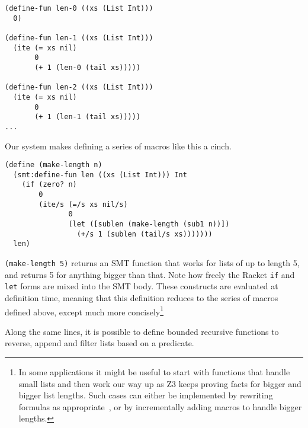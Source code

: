 \begin{verbatim}
(define-fun len-0 ((xs (List Int)))
  0)

(define-fun len-1 ((xs (List Int)))
  (ite (= xs nil)
       0
       (+ 1 (len-0 (tail xs)))))

(define-fun len-2 ((xs (List Int)))
  (ite (= xs nil)
       0
       (+ 1 (len-1 (tail xs)))))
...
\end{verbatim}

Our system makes defining a series of macros like this a cinch.

\begin{verbatim}
(define (make-length n)
  (smt:define-fun len ((xs (List Int))) Int
    (if (zero? n)
        0
        (ite/s (=/s xs nil/s)
               0
               (let ([sublen (make-length (sub1 n))])
                 (+/s 1 (sublen (tail/s xs)))))))
  len)
\end{verbatim}

\texttt{(make-length 5)} returns an SMT function that works for lists of up to
length 5, and returns 5 for anything bigger than that. Note how freely the
Racket \texttt{if} and \texttt{let} forms are mixed into the SMT body. These
constructs are evaluated at definition time, meaning that this definition
reduces to the series of macros defined above, except much more
concisely\footnote{In some applications it might be useful to start with
functions that handle small lists and then work our way up as Z3 keeps proving
facts for bigger and bigger list lengths. Such cases can either be implemented
by rewriting formulas as appropriate~\cite{sat-recursive}, or by incrementally
adding macros to handle bigger lengths.}

Along the same lines, it is possible to define bounded recursive functions to
reverse, append and filter lists based on a predicate.
